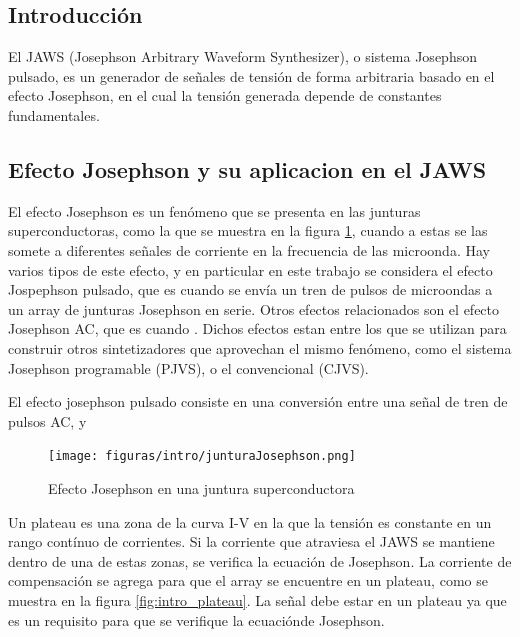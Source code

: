 \documentclass[twoside]{article}
\begin{document}
\begin{multicols}{2}

\section{Introducción}

El JAWS (Josephson Arbitrary Waveform Synthesizer), o sistema Josephson pulsado, es un generador de señales de tensión de forma arbitraria basado en el efecto Josephson, en el cual la tensión generada depende de constantes fundamentales.

\subsection{Efecto Josephson y su aplicacion en el JAWS}

El efecto Josephson es un fenómeno que se presenta en las junturas superconductoras, como la que se muestra en la figura \ref{fig:intro_junturaJosephson}, cuando a estas se las somete a diferentes señales de corriente en la frecuencia de las microonda. Hay varios tipos de este efecto, y en particular en este trabajo se considera el efecto Jospephson pulsado, que es cuando se envía un tren de pulsos de microondas a un array de junturas Josephson en serie. Otros efectos relacionados son el efecto Josephson AC, que es cuando . Dichos efectos estan entre los que se utilizan para construir otros sintetizadores que aprovechan el mismo fenómeno, como el sistema Josephson programable (PJVS), o el convencional (CJVS). 

El efecto josephson pulsado consiste en una conversión entre una señal de tren de pulsos AC,  y 



\begin{figure}[H]
    \centering
    \texttt{[image: figuras/intro/junturaJosephson.png]}
    \caption{Efecto Josephson en una juntura superconductora}
    \label{fig:intro_junturaJosephson}
\end{figure}



Un plateau es una zona de la curva I-V en la que la tensión es constante en un rango contínuo de corrientes. Si la corriente que atraviesa el JAWS se mantiene dentro de una de estas zonas, se verifica la ecuación de Josephson.
La corriente de compensación se agrega para que el array se encuentre en un plateau, como se muestra en la figura \ref{fig:intro_plateau}. La señal debe estar en un plateau ya que es un requisito para que se verifique la ecuaciónde Josephson.


\end{multicols}
\end{document}
